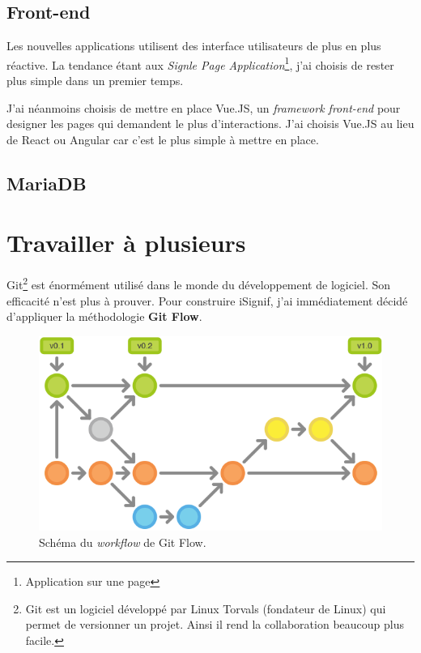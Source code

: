 \documentclass[]{report}
\begin{document}
    \subsection{Front-end}

      Les nouvelles applications utilisent des interface utilisateurs de plus en plus réactive. La tendance étant aux \textit{Signle Page Application}\footnote{Application sur une page}, j'ai choisis de rester plus simple dans un premier temps.

      J'ai néanmoins choisis de mettre en place Vue.JS, un \textit{framework front-end} pour designer les pages qui demandent le plus d’interactions. J'ai choisis Vue.JS au lieu de React ou Angular car c'est le plus simple à mettre en place.

    \subsection{MariaDB}


  \section{Travailler à plusieurs}\label{sec:git}

    Git\footnote{Git est un logiciel développé par Linux Torvals (fondateur de Linux) qui permet de versionner un projet. Ainsi il rend la collaboration beaucoup plus facile.} est énormément utilisé dans le monde du développement de logiciel. Son efficacité n'est plus à prouver. Pour construire iSignif, j'ai immédiatement décidé d'appliquer la méthodologie \textbf{Git Flow}.

    \begin{figure}
      \includegraphics[width=\linewidth]{img/git-flow.png}
      \caption{Schéma du \textit{workflow} de Git Flow.}
      \label{fig:git-flow}
    \end{figure}
\end{document}
